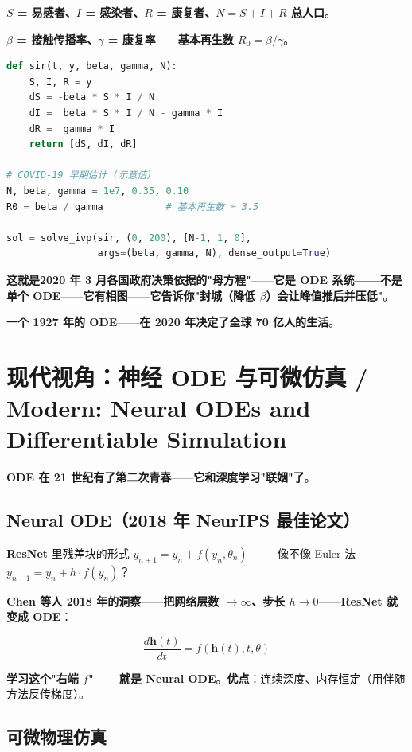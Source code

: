 \textbf{$S$ = 易感者、$I$ = 感染者、$R$ = 康复者、$N = S + I + R$ 总人口}。

\textbf{$\beta$ = 接触传播率、$\gamma$ = 康复率}——\textbf{基本再生数 $R_0 = \beta/\gamma$}。

\begin{lstlisting}[language=Python]
def sir(t, y, beta, gamma, N):
    S, I, R = y
    dS = -beta * S * I / N
    dI =  beta * S * I / N - gamma * I
    dR =  gamma * I
    return [dS, dI, dR]

# COVID-19 早期估计 (示意值)
N, beta, gamma = 1e7, 0.35, 0.10
R0 = beta / gamma           # 基本再生数 ≈ 3.5

sol = solve_ivp(sir, (0, 200), [N-1, 1, 0],
                args=(beta, gamma, N), dense_output=True)
\end{lstlisting}

\textbf{这就是\textbf{2020 年 3 月各国政府决策依据的"母方程"}}——\textbf{它是 ODE 系统——不是单个 ODE}——\textbf{它有相图}——\textbf{它告诉你"封城（降低 $\beta$）会让峰值推后并压低"}。

\textbf{一个 1927 年的 ODE}——\textbf{在 2020 年决定了全球 70 亿人的生活}。

\section{现代视角：神经 ODE 与可微仿真 / Modern: Neural ODEs and Differentiable Simulation}

\textbf{ODE 在 21 世纪有了第二次青春}——\textbf{它和深度学习"联姻"了}。

\subsection{Neural ODE（2018 年 NeurIPS 最佳论文）}

\textbf{ResNet} 里残差块的形式 $y_{n+1} = y_n + f(y_n, \theta_n)$ —— 像不像 Euler 法 $y_{n+1} = y_n + h \cdot f(y_n)$？

\textbf{Chen 等人 2018 年的洞察}——\textbf{把网络层数 $\to \infty$、步长 $h \to 0$}——\textbf{ResNet 就变成 ODE}：

\[
\frac{d\bm{h}(t)}{dt} = f(\bm{h}(t), t, \theta)
\]

\textbf{学习这个"右端 $f$"——就是 Neural ODE}。\textbf{优点}：连续深度、内存恒定（用伴随方法反传梯度）。

\subsection{可微物理仿真}

